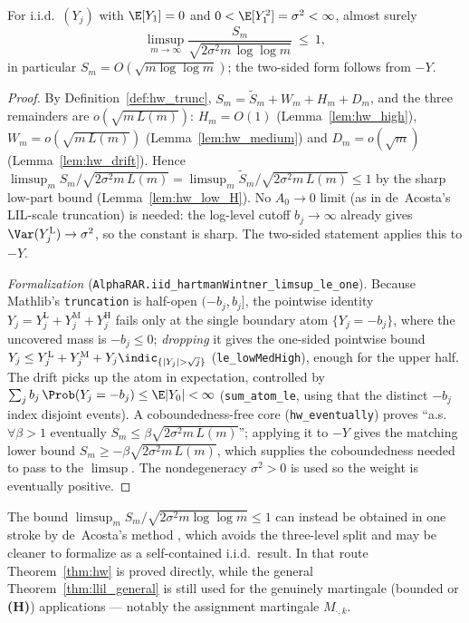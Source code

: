 \begin{theorem}\label{thm:hw}
\leanok
{}
For i.i.d.\ $(Y_j)$ with $\E[Y_1]=0$ and $0<\E[Y_1^2]=\sigma^2<\infty$, almost surely
\[
  \limsup_{m\to\infty}\frac{S_m}{\sqrt{2\sigma^2 m\,\log\log m}}\ \le\ 1,
\]
in particular $S_m=O(\sqrt{m\log\log m})$; the two-sided form follows from $-Y$.
\end{theorem}
\begin{proof}\leanok
By Definition~\ref{def:hw_trunc}, $S_m=\tilde S_m+W_m+H_m+D_m$, and the three remainders
are $o(\sqrt{m\,L(m)})$: $H_m=O(1)$ (Lemma~\ref{lem:hw_high}), $W_m=o(\sqrt{m\,L(m)})$
(Lemma~\ref{lem:hw_medium}) and $D_m=o(\sqrt m)$ (Lemma~\ref{lem:hw_drift}). Hence
$\limsup_m S_m/\sqrt{2\sigma^2 m\,L(m)}=\limsup_m\tilde S_m/\sqrt{2\sigma^2 m\,L(m)}\le1$
by the sharp low-part bound (Lemma~\ref{lem:hw_low_H}). No $A_0\to0$ limit (as in
de~Acosta's LIL-scale truncation) is needed: the log-level cutoff $b_j\to\infty$ already
gives $\Var(Y_j^{\mathrm L})\to\sigma^2$, so the constant is sharp. The two-sided statement
applies this to $-Y$.

\emph{Formalization} (\texttt{AlphaRAR.iid\_hartmanWintner\_limsup\_le\_one}). Because Mathlib's
\texttt{truncation} is half-open $(-b_j,b_j]$, the pointwise identity $Y_j=Y_j^{\mathrm L}+
Y_j^{\mathrm M}+Y_j^{\mathrm H}$ fails only at the single boundary atom $\{Y_j=-b_j\}$, where the
uncovered mass is $-b_j\le0$; \emph{dropping} it gives the one-sided pointwise bound $Y_j\le
Y_j^{\mathrm L}+Y_j^{\mathrm M}+Y_j\indic_{\{|Y_j|>\sqrt j\}}$ (\texttt{le\_lowMedHigh}), enough for the
upper half. The drift picks up the atom in expectation, controlled by $\sum_j b_j\,\Prob(Y_j=-b_j)\le
\E|Y_0|<\infty$ (\texttt{sum\_atom\_le}, using that the distinct $-b_j$ index disjoint events).
A coboundedness-free core (\texttt{hw\_eventually}) proves ``a.s.\ $\forall\beta>1$ eventually
$S_m\le\beta\sqrt{2\sigma^2 m\,L(m)}$''; applying it to $-Y$ gives the matching lower bound
$S_m\ge-\beta\sqrt{2\sigma^2 m\,L(m)}$, which supplies the coboundedness needed to pass to the
$\limsup$. The nondegeneracy $\sigma^2>0$ is used so the weight is eventually positive.
\end{proof}

\begin{remark}\label{rem:hw_deacosta}
The bound $\limsup_m S_m/\sqrt{2\sigma^2 m\log\log m}\le1$ can instead be obtained in one
stroke by de~Acosta's method \cite{deAcosta1983}, which avoids the three-level split and
may be cleaner to formalize as a self-contained i.i.d.\ result. In that route
Theorem~\ref{thm:hw} is proved directly, while the general Theorem~\ref{thm:llil_general}
is still used for the genuinely martingale (bounded or \textbf{(H)}) applications ---
notably the assignment martingale $M_{\cdot,k}$.
\end{remark}

